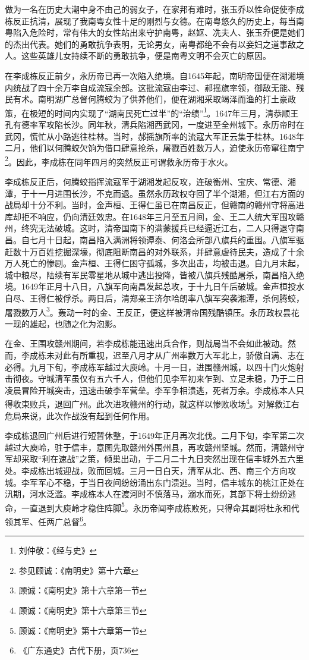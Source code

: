 做为一名在历史大潮中身不由己的弱女子，在家邦有难时，张玉乔以性命促使李成栋反正抗清，展现了我南粤女性十足的刚烈与女德。在南粤悠久的历史上，每当南粤陷入危险时，常有伟大的女性站出来守护南粤，赵妪、冼夫人、张玉乔便是她们的杰出代表。她们的勇敢抗争表明，无论男女，南粤都绝不会有以妾妇之道事敌之人。这些英雄儿女持续不断的勇敢抗争，便是南粤文明不会灭亡的原因。

在李成栋反正前夕，永历帝已再一次陷入绝境。自1645年起，南明帝国便在湖湘境内统战了四十余万李自成流寇余部。这批流寇由李过、郝摇旗率领，御敌无能、残民有术。南明湖广总督何腾蛟为了供养他们，便在湖湘采取竭泽而渔的打土豪政策，在极短的时间内实现了“湖南民死亡过半”的“治绩”\footnote{刘仲敬：《经与史》}。1647年三月，清恭顺王孔有德率军攻陷长沙。同年秋，清兵陷湘西武冈，一度进至全州城下。永历帝时在武冈，慌忙从小路逃往桂林。当时，郝摇旗所率的流寇大军正云集于桂林。1648年二月，他们以何腾蛟欠饷为借口肆意抢杀，屠戮百姓数万人，迫使永历帝窜往南宁\footnote{参见顾诚：《南明史》第十六章}。因此，李成栋在同年四月的突然反正可谓救永历帝于水火。

李成栋反正后，何腾蛟指挥流寇军于湖湘发起反攻，连破衡州、宝庆、常德、湘潭，于十一月进围长沙，不克而退。虽然永历政权夺回了半个湖湘，但江右方面的战局却十分不利。当时，金声桓、王得仁虽已在南昌反正，但赣南的赣州守将高进库却拒不响应，仍向清廷效忠。在1648年三月至五月间，金、王二人统大军围攻赣州，终究无法破城。这时，清帝国南下的满蒙援兵已经逼近江右，二人只得退守南昌。自七月十日起，南昌陷入满洲将领谭泰、何洛会所部八旗兵的重围。八旗军驱赶数十万百姓挖掘深壕，彻底阻断南昌的对外联系，并肆意虐待民夫，造成了十余万人死亡的惨剧。金声桓、王得仁困守孤城，多次出击，均被击退。自九月末起，城中粮尽，陆续有军民零星地从城中逃出投降，皆被八旗兵残酷屠杀，南昌陷入绝境。1649年正月十八日，八旗军向南昌发起总攻，于十九日午后破城。金声桓投水自尽、王得仁被俘杀。两日后，清郑亲王济尔哈朗率八旗军突袭湘潭，杀何腾蛟，屠戮数万人\footnote{顾诚：《南明史》第十六章第一节}。轰动一时的金、王反正，便这样被清帝国残酷镇压。永历政权昙花一现的雄起，也随之化为泡影。

在金、王围攻赣州期间，若李成栋能迅速出兵合作，则战局当不会如此被动。然而，李成栋未对此有所重视，迟至八月才从广州率数万大军北上，骄傲自满、志在必得。九月下旬，李成栋军越过大庾岭。十月一日，进围赣州城，以四十门火炮射击彻夜。守城清军虽仅有五六千人，但他们见李军初来乍到、立足未稳，乃于二日凌晨冒险开城突击，迅速击破李军营垒。李军争相溃逃，死者万余。李成栋本人只得收束败兵，退回广州。此次进攻赣州的行动，就这样以惨败收场\footnote{顾诚：《南明史》第十六章第三节}。对解救江右危局来说，此次作战没有起到任何作用。

李成栋退回广州后进行短暂休整，于1649年正月再次北伐。二月下旬，李军第二次越过大庾岭，驻于信丰，意图先取赣州外围州县，再攻赣州坚城。然而，清赣州守军却采取“利在速战”之策，倾巢出动，于二月二十九日突然出现在信丰城外五六里处。李成栋出城迎战，败而回城。三月一日白天，清军从北、西、南三个方向攻城。李军军心不稳，于当日夜间纷纷涌出东门溃逃。当时，信丰城东的桃江正处在汛期，河水泛滥。李成栋本人在渡河时不慎落马，溺水而死，其部下将士纷纷逃命，一直退到大庾岭才稳住阵脚\footnote{顾诚：《南明史》第十六章第一节}。永历帝闻李成栋败死，只得命其副将杜永和代领其军、任两广总督\footnote{《广东通史》古代下册，页736}。

